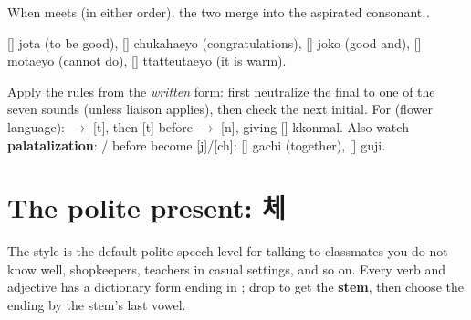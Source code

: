 When  meets  (in either order), the two merge into the aspirated
consonant .

\begin{example}[Aspiration]
 [] jota (to be good),  [] chukahaeyo
(congratulations),  [] joko (good and), 
[] motaeyo (cannot do),  [] ttatteutaeyo (it is
warm).
\end{example}

\begin{important}
Apply the rules from the \emph{written} form: first neutralize the final to one of the
seven sounds (unless liaison applies), then check the next initial. For 
(flower language):  $\to$ [t], then [t] before  $\to$ [n], giving
[] kkonmal. Also watch \textbf{palatalization}: / before 
become [j]/[ch]:  [] gachi (together),  [] guji.
\end{important}

\section{The polite present: 체}

The  style is the default polite speech level for talking to classmates you do not
know well, shopkeepers, teachers in casual settings, and so on. Every verb and adjective
has a dictionary form ending in ; drop  to get the \textbf{stem}, then
choose the ending by the stem's last vowel.

\begin{center}
\end{center}

